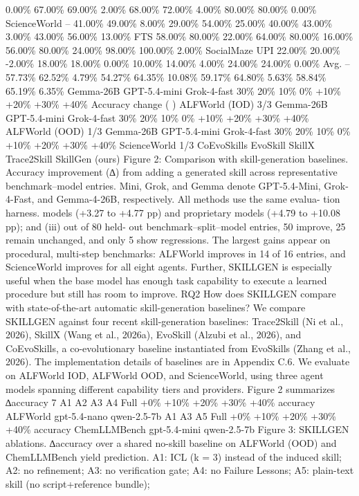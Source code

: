 0.00\%
67.00\% 69.00\%
2.00\%
68.00\% 72.00\%
4.00\%
80.00\%
80.00\%
0.00\%
ScienceWorld
–
41.00\% 49.00\%
8.00\%
29.00\% 54.00\% 25.00\% 40.00\% 43.00\%
3.00\%
43.00\%
56.00\%
13.00\%
FTS
58.00\% 80.00\% 22.00\% 64.00\% 80.00\% 16.00\% 56.00\% 80.00\% 24.00\% 98.00\% 100.00\%
2.00\%
SocialMaze
UPI
22.00\% 20.00\% -2.00\% 18.00\% 18.00\%
0.00\%
10.00\% 14.00\%
4.00\%
24.00\%
24.00\%
0.00\%
Avg.
–
57.73\% 62.52\% 4.79\% 54.27\% 64.35\% 10.08\% 59.17\% 64.80\% 5.63\% 58.84\% 65.19\%
6.35\%
Gemma-26B
GPT-5.4-mini
Grok-4-fast
30\%
20\%
10\%
0\%
+10\%
+20\%
+30\%
+40\%
Accuracy change ( )
ALFWorld  (IOD)
 3/3
Gemma-26B
GPT-5.4-mini
Grok-4-fast
30\%
20\%
10\%
0\%
+10\%
+20\%
+30\%
+40\%
ALFWorld  (OOD)
 1/3
Gemma-26B
GPT-5.4-mini
Grok-4-fast
30\%
20\%
10\%
0\%
+10\%
+20\%
+30\%
+40\%
ScienceWorld
 1/3
CoEvoSkills
EvoSkill
SkillX
Trace2Skill
  SkillGen (ours)
Figure 2: Comparison with skill-generation baselines. Accuracy improvement (∆) from adding
a generated skill across representative benchmark–model entries. Mini, Grok, and Gemma denote
GPT-5.4-Mini, Grok-4-Fast, and Gemma-4-26B, respectively. All methods use the same evalua-
tion harness.
models (+3.27 to +4.77 pp) and proprietary models (+4.79 to +10.08 pp); and (iii) out of 80 held-
out benchmark–split–model entries, 50 improve, 25 remain unchanged, and only 5 show regressions.
The largest gains appear on procedural, multi-step benchmarks: ALFWorld improves in 14 of 16
entries, and ScienceWorld improves for all eight agents. Further, SKILLGEN is especially useful
when the base model has enough task capability to execute a learned procedure but still has room to
improve.
RQ2 How does SKILLGEN compare with state-of-the-art automatic skill-generation baselines?
We compare SKILLGEN against four recent skill-generation baselines: Trace2Skill (Ni et al., 2026),
SkillX (Wang et al., 2026a), EvoSkill (Alzubi et al., 2026), and CoEvoSkills, a co-evolutionary
baseline instantiated from EvoSkills (Zhang et al., 2026). The implementation details of baselines are
in Appendix C.6. We evaluate on ALFWorld IOD, ALFWorld OOD, and ScienceWorld, using three
agent models spanning different capability tiers and providers. Figure 2 summarizes ∆accuracy
7
A1
A2
A3
A4
Full
+0\%
+10\%
+20\%
+30\%
+40\%
 accuracy
ALFWorld
gpt-5.4-nano
qwen-2.5-7b
A1
A3
A5
Full
+0\%
+10\%
+20\%
+30\%
+40\%
 accuracy
ChemLLMBench
gpt-5.4-mini
qwen-2.5-7b
Figure 3: SKILLGEN ablations. ∆accuracy over a shared no-skill baseline on ALFWorld (OOD) and
ChemLLMBench yield prediction. A1: ICL (k = 3) instead of the induced skill; A2: no refinement;
A3: no verification gate; A4: no Failure Lessons; A5: plain-text skill (no script+reference bundle);

